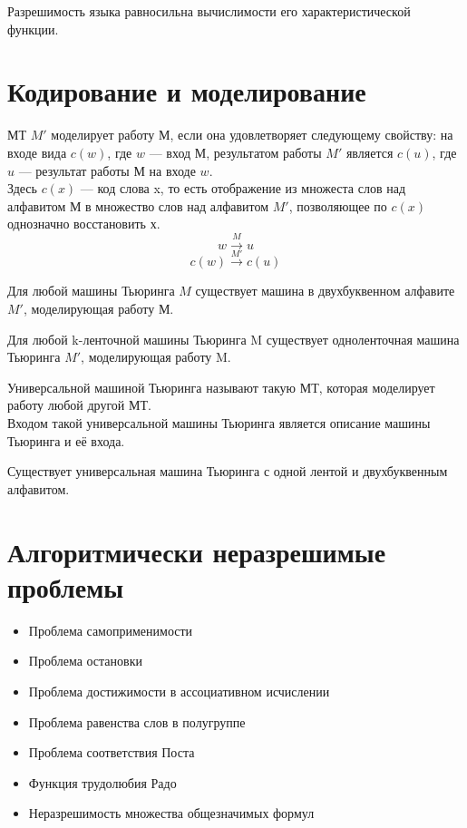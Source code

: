 \documentclass[11pt]{article}
\begin{document}
\begin{remark}
    Разрешимость языка равносильна вычислимости его характеристической функции.
\end{remark}



\section{Кодирование и моделирование}

МТ $M'$ моделирует работу М, если она удовлетворяет следующему свойству: на входе вида $c(w)$, где $w$ --- вход М,
результатом работы $M'$ является $c(u)$, где $u$ --- результат работы М на входе $w$.\\
Здесь $c(x)$ --- код слова x, то есть отображение из множеста слов над алфавитом М в множество слов над алфавитом $M'$, позволяющее по $c(x)$ однозначно восстановить х.
\[ w\xrightarrow{M} u \]
\[ c(w)\xrightarrow{M'} c(u) \]

\begin{theorem}
    Для любой машины Тьюринга $M$ существует машина в двухбуквенном алфавите $M'$, моделирующая работу М.
\end{theorem}

\begin{theorem}
    Для любой k-ленточной машины Тьюринга M существует одноленточная машина Тьюринга $M'$, моделирующая работу M. 
\end{theorem}

\begin{definition}
    $\textbf{Универсальной}$ машиной Тьюринга называют такую МТ, которая моделирует работу любой другой МТ.\\
    Входом такой универсальной машины Тьюринга является описание машины Тьюринга и её входа.
\end{definition}

\begin{theorem}
    Существует универсальная машина Тьюринга с одной лентой и двухбуквенным алфавитом.
\end{theorem}


\section{Алгоритмически неразрешимые проблемы}
\begin{itemize}
    \item Проблема самоприменимости 
    \item Проблема остановки
    \item Проблема достижимости в ассоциативном исчислении
    \item Проблема равенства слов в полугруппе
    \item Проблема соответствия Поста
    \item Функция трудолюбия Радо
    \item Неразрешимость множества общезначимых формул
\end{itemize}
\end{document}
